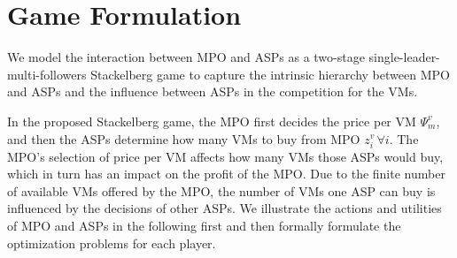 \documentclass[conference]{IEEEtran}
\begin{document}
\section{Game Formulation}
We model the interaction between MPO and ASPs as a two-stage single-leader-multi-followers Stackelberg game to capture the intrinsic hierarchy between MPO and ASPs and the influence between ASPs in the competition for the VMs.

In the proposed Stackelberg game, the MPO first decides the price per VM $\Psi_{m}^v$, and then the ASPs determine how many VMs to buy from MPO $z_i^v \, \forall i$. The MPO's selection of price per VM affects how many VMs those ASPs would buy, which in turn has an impact on the profit of the MPO. %
Due to the finite number of available VMs offered by the MPO, the number of VMs one ASP can buy is influenced by the decisions of other ASPs. %
We illustrate the actions and utilities of MPO and ASPs in the following first and then formally formulate the optimization problems for each player.
\end{document}
